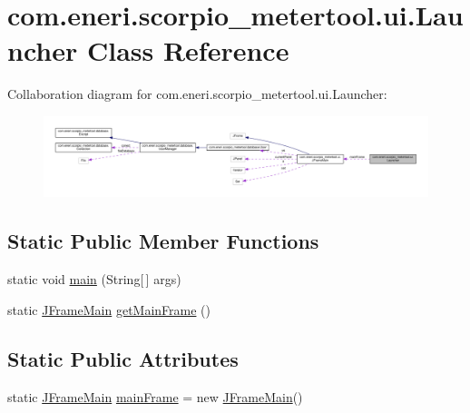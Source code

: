 \hypertarget{classcom_1_1eneri_1_1scorpio__metertool_1_1ui_1_1_launcher}{}\section{com.\+eneri.\+scorpio\+\_\+metertool.\+ui.\+Launcher Class Reference}
\label{classcom_1_1eneri_1_1scorpio__metertool_1_1ui_1_1_launcher}


Collaboration diagram for com.\+eneri.\+scorpio\+\_\+metertool.\+ui.\+Launcher\+:
\nopagebreak
\begin{figure}[H]
\begin{center}
\leavevmode
\includegraphics[width=350pt]{classcom_1_1eneri_1_1scorpio__metertool_1_1ui_1_1_launcher__coll__graph}
\end{center}
\end{figure}
\subsection*{Static Public Member Functions}
\begin{DoxyCompactItemize}
\item 
static void \hyperlink{classcom_1_1eneri_1_1scorpio__metertool_1_1ui_1_1_launcher_acbcae003008d6a5fb89d4b24be0e7d61}{main} (String\mbox{[}$\,$\mbox{]} args)
\item 
static \hyperlink{classcom_1_1eneri_1_1scorpio__metertool_1_1ui_1_1_j_frame_main}{J\+Frame\+Main} \hyperlink{classcom_1_1eneri_1_1scorpio__metertool_1_1ui_1_1_launcher_a3bf1998ad76ca07d71a8b679292486ef}{get\+Main\+Frame} ()
\end{DoxyCompactItemize}
\subsection*{Static Public Attributes}
\begin{DoxyCompactItemize}
\item 
static \hyperlink{classcom_1_1eneri_1_1scorpio__metertool_1_1ui_1_1_j_frame_main}{J\+Frame\+Main} \hyperlink{classcom_1_1eneri_1_1scorpio__metertool_1_1ui_1_1_launcher_a0fa4290667c7cb8b5491f47d7e8542c6}{main\+Frame} = new \hyperlink{classcom_1_1eneri_1_1scorpio__metertool_1_1ui_1_1_j_frame_main}{J\+Frame\+Main}()
\end{DoxyCompactItemize}


